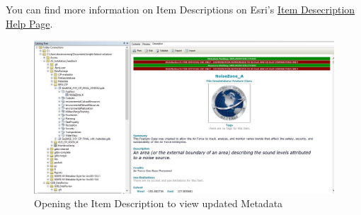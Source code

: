 \documentclass[openany]{book}
\theoremstyle{definition}
\theoremstyle{definition}
\theoremstyle{definition}
\theoremstyle{remark}
\begin{document}
You can find more information on Item Descriptions on Esri's
\href{http://desktop.arcgis.com/en/arcmap/latest/map/working-with-arcmap/documenting-items-in-the-catalog-window.htm}{Item
Desecription Help Page}.

\begin{figure}[H]

{\centering \includegraphics{figures/imMetaArc-after} 

}

\caption{Opening the Item Description to view updated Metadata}\label{fig:imMetaArcafter}
\end{figure}


\end{document}

